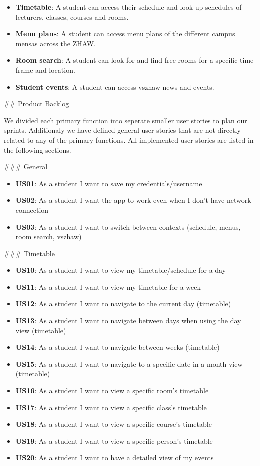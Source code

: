 \begin{markdown}
\begin{itemize}
  \item \textbf{Timetable}: A student can access their schedule and look up schedules of lecturers, classes, courses and rooms.
  \item \textbf{Menu plans}: A student can access menu plans of the different campus mensas across the ZHAW.
  \item \textbf{Room search}: A student can look for and find free rooms for a specific time-frame and location.
  \item \textbf{Student events}: A student can access vszhaw news and events.
\end{itemize}

\newpage

## Product Backlog

We divided each primary function into seperate smaller user stories to plan our sprints. Additionaly we have defined general user stories that are not directly related to any of the primary functions. All implemented user stories are listed in the following sections.

### General

\begin{itemize}
  \item \textbf{US01}: As a student I want to save my credentials/username
  \item \textbf{US02}: As a student I want the app to work even when I don't have network connection
  \item \textbf{US03}: As a student I want to switch between contexts (schedule, menus, room search, vszhaw)
\end{itemize}

### Timetable

\begin{itemize}
  \item \textbf{US10}: As a student I want to view my timetable/schedule for a day
  \item \textbf{US11}: As a student I want to view my timetable for a week
  \item \textbf{US12}: As a student I want to navigate to the current day (timetable)
  \item \textbf{US13}: As a student I want to navigate between days when using the day view (timetable)
  \item \textbf{US14}: As a student I want to navigate between weeks (timetable)
  \item \textbf{US15}: As a student I want to navigate to a specific date in a month view (timetable)
  \item \textbf{US16}: As a student I want to view a specific room's timetable
  \item \textbf{US17}: As a student I want to view a specific class's timetable
  \item \textbf{US18}: As a student I want to view a specific course's timetable
  \item \textbf{US19}: As a student I want to view a specific person's timetable
  \item \textbf{US20}: As a student I want to have a detailed view of my events
\end{itemize}


\end{markdown}
